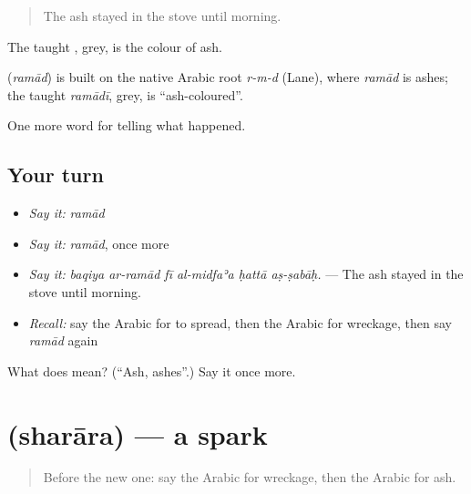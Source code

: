 \begin{quote}
The ash stayed in the stove until morning.
\end{quote}

The taught , grey, is the colour of ash.

\begin{cousinweb}
\textbf{} (\emph{ramād}) is built on the native Arabic root \emph{r-m-d} (Lane), where \emph{ramād} is ashes; the taught \emph{ramādī}, grey, is \textquotedblleft{}ash-coloured\textquotedblright{}.
\end{cousinweb}

\begin{grammarlens}[title={What you've built}]
One more word for telling what happened.
\end{grammarlens}

\subsection*{Your turn}
\begin{itemize}
\raggedright
  \item \emph{Say it:} \emph{ramād}
  \item \emph{Say it:} \emph{ramād}, once more
  \item \emph{Say it:} \emph{baqiya ar-ramād fī al-midfaʾa ḥattā aṣ-ṣabāḥ.} — The ash stayed in the stove until morning.
  \item \emph{Recall:} say the Arabic for to spread, then the Arabic for wreckage, then say \emph{ramād} again
\end{itemize}

\begin{tcolorbox}[breakable,colback=teal!4,colframe=teal!35!black,title={Before you move on}]
What does  mean? (\textquotedblleft{}Ash, ashes\textquotedblright{}.) Say it once more.
\end{tcolorbox}
\section[\texorpdfstring{\ar{شرارة} (sharāra)}{شرارة (sharāra)}]{ (sharāra) — a spark}

\label{lesson:AR-C354-sharara}



\begin{quote}
Before the new one: say the Arabic for wreckage, then the Arabic for ash.
\end{quote}

